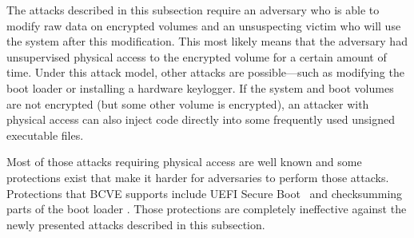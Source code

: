 \documentclass[11pt]{article}
\begin{document}
The attacks described in this subsection require an adversary who is able to modify raw data on encrypted volumes and an unsuspecting victim who will use the system after this modification. This most likely means that the adversary had unsupervised physical access to the encrypted volume for a certain amount of time. Under this attack model, other attacks are possible---such as modifying the boot loader \cite{evilmaid} or installing a hardware keylogger. If the system and boot volumes are not encrypted (but some other volume is encrypted), an attacker with physical access can also inject code directly into some frequently used unsigned executable files. 

Most of those attacks requiring physical access are well known and some protections exist that make it harder for adversaries to perform those attacks. Protections that BCVE supports include UEFI Secure Boot~\cite{jetico_secure_boot} and checksumming parts of the boot loader \cite{hornak}. Those protections are completely ineffective against the newly presented attacks described in this subsection.
	
	
	{}
	
\end{document}
